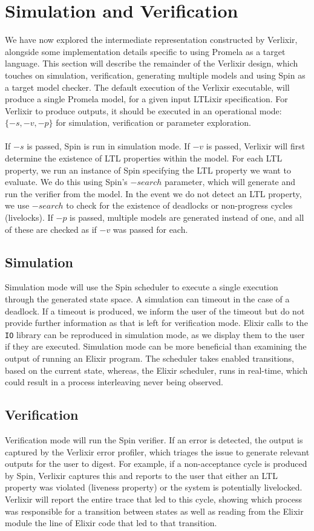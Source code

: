 \section{Simulation and Verification} \label{sec:simulation_verification}
We have now explored the intermediate representation constructed by Verlixir, alongside some implementation details specific to using Promela as a target language. This section will describe the remainder of the Verlixir design, which touches on simulation, verification, generating multiple models and using Spin as a target model checker. The default execution of the Verlixir executable, will produce a single Promela model, for a given input LTLixir specification. For Verlixir to produce outputs, it should be executed in an operational mode: $\{-s, -v, -p\}$ for simulation, verification or parameter exploration.
\\ \\
If $-s$ is passed, Spin is run in simulation mode. If $-v$ is passed, Verlixir will first determine the existence of LTL properties within the model. For each LTL property, we run an instance of Spin specifying the LTL property we want to evaluate. We do this using Spin's $-search$ parameter, which will generate and run the verifier from the model. In the event we do not detect an LTL property, we use $-search$ to check for the existence of deadlocks or non-progress cycles (livelocks). If $-p$ is passed, multiple models are generated instead of one, and all of these are checked as if $-v$ was passed for each.
\subsection{Simulation}
Simulation mode will use the Spin scheduler to execute a single execution through the generated state space. A simulation can timeout in the case of a deadlock. If a timeout is produced, we inform the user of the timeout but do not provide further information as that is left for verification mode. Elixir calls to the \texttt{IO} library can be reproduced in simulation mode, as we display them to the user if they are executed. Simulation mode can be more beneficial than examining the output of running an Elixir program. The scheduler takes enabled transitions, based on the current state, whereas, the Elixir scheduler, runs in real-time, which could result in a process interleaving never being observed.
\subsection{Verification}
Verification mode will run the Spin verifier. If an error is detected, the output is captured by the Verlixir error profiler, which triages the issue to generate relevant outputs for the user to digest. For example, if a non-acceptance cycle is produced by Spin, Verlixir captures this and reports to the user that either an LTL property was violated (liveness property) or the system is potentially livelocked. Verlixir will report the entire trace that led to this cycle, showing which process was responsible for a transition between states as well as reading from the Elixir module the line of Elixir code that led to that transition. 
\\ \\
